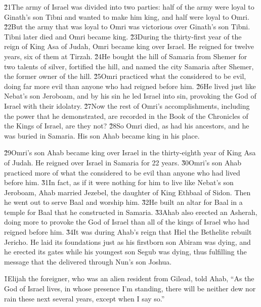 \v{21}The army of Israel was divided into two parties: half of the army were loyal to Ginath's son Tibni and wanted to make him king, and half were loyal to Omri. \v{22}But the army that was loyal to Omri was victorious over Ginath's son Tibni. Tibni later died and Omri became king. \v{23}During the thirty-first year of the reign of King Asa of Judah, Omri became king over Israel. He reigned for twelve years, six of them at Tirzah. \v{24}He bought the hill of Samaria from Shemer for two talents of silver, fortified the hill, and named the city Samaria after Shemer, the former owner of the hill. \v{25}Omri practiced what the  considered to be evil, doing far more evil than anyone who had reigned before him. \v{26}He lived just like Nebat's son Jeroboam, and by his sin he led Israel into sin, provoking the  God of Israel with their idolatry. \v{27}Now the rest of Omri's accomplishments, including the power that he demonstrated, are recorded in the Book of the Chronicles of the Kings of Israel, are they not? \v{28}So Omri died, as had his ancestors, and he was buried in Samaria. His son Ahab became king in his place.

\v{29}Omri's son Ahab became king over Israel in the thirty-eighth year of King Asa of Judah. He reigned over Israel in Samaria for 22 years. \v{30}Omri's son Ahab practiced more of what the  considered to be evil than anyone who had lived before him. \v{31}In fact, as if it were nothing for him to live like Nebat's son Jeroboam, Ahab married Jezebel, the daughter of King Ethbaal of Sidon. Then he went out to serve Baal and worship him. \v{32}He built an altar for Baal in a temple for Baal that he constructed in Samaria. \v{33}Ahab also erected an Asherah, doing more to provoke the  God of Israel than all of the kings of Israel who had reigned before him. \v{34}It was during Ahab's reign that Hiel the Bethelite rebuilt Jericho. He laid its foundations just as his firstborn son Abiram was dying, and he erected its gates while his youngest son Segub was dying, thus fulfilling the message that the  delivered through Nun's son Joshua.

\v{1}Elijah the foreigner, who was an alien resident from Gilead, told Ahab, ``As the  God of Israel lives, in whose presence I'm standing, there will be neither dew nor rain these next several years, except when I say so.''

